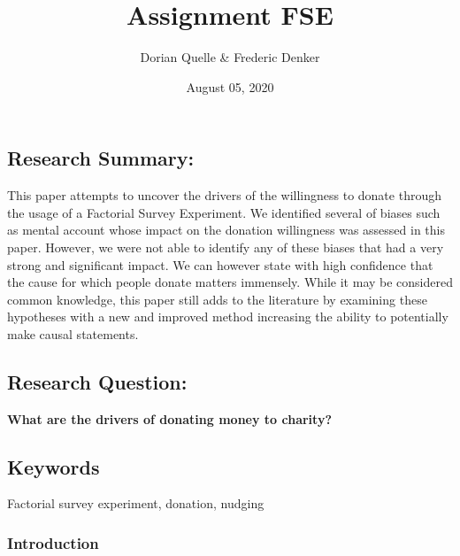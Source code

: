 \documentclass[
  12pt,
]{article}
\title{Assignment FSE}
\author{Dorian Quelle \& Frederic Denker}
\date{August 05, 2020}
\begin{document}
\maketitle

\hypertarget{research-summary}{%
\subsection{Research Summary:}\label{research-summary}}

This paper attempts to uncover the drivers of the willingness to donate
through the usage of a Factorial Survey Experiment. We identified
several of biases such as mental account whose impact on the donation
willingness was assessed in this paper. However, we were not able to
identify any of these biases that had a very strong and significant
impact. We can however state with high confidence that the cause for
which people donate matters immensely. While it may be considered common
knowledge, this paper still adds to the literature by examining these
hypotheses with a new and improved method increasing the ability to
potentially make causal statements.

\hypertarget{research-question}{%
\subsection{Research Question:}\label{research-question}}

\textbf{What are the drivers of donating money to charity?}

\hypertarget{keywords}{%
\subsection{Keywords}\label{keywords}}

Factorial survey experiment, donation, nudging

\newpage

\hypertarget{introduction}{%
\subsubsection{Introduction}\label{introduction}}
\end{document}

